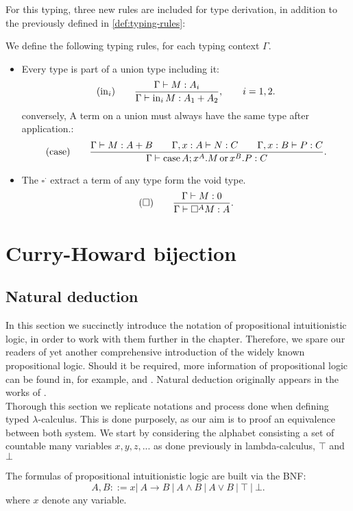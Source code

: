 For this typing, three new rules are included for type derivation, in addition to the previously defined in \ref{def:typing-rules}:
\begin{definition}
  We define the following typing rules, for each typing context $\Gamma$.
  \begin{itemize}
  \item Every type is part of a union type including it:
    $$  (\operatorname{in}_i)\qquad  {\displaystyle\Gamma \vdash M:A_i \over \Gamma \vdash \operatorname{in}_i M:A_1+A_2},\qquad  i=  1,2.$$
  conversely, A term on a union must always have the same type after application.:
    $$(\operatorname{case}) \qquad {\displaystyle \Gamma\vdash M: A+B\qquad \Gamma, x:A\vdash N: C\qquad \Gamma, x:B\vdash P: C \over \Gamma \vdash \operatorname{case}A ; x^{A}.M\operatorname{ or }x^{B}.P:C}.$$
  \item The $\square^\cdot$ extract a term of any type form the void type.
    $$  (\square)\qquad  {\displaystyle\Gamma \vdash M:0 \over \Gamma \vdash \square^A M:A}.$$
  \end{itemize}
\end{definition}
\section{Curry-Howard bijection}
\subsection{Natural deduction}
In this section we succinctly introduce the notation of propositional intuitionistic logic, in order to work with them further in the chapter. Therefore, we spare our readers of yet another comprehensive introduction of the widely known propositional logic. Should it be required, more information of propositional logic can be found in, for example, \cite{marek2009introduction} and \cite{wadler2015propositions}. Natural deduction originally appears in the works of \cite{gentzen1935untersuchungen}. \\

Thorough this section we replicate notations and process done when defining typed $\lambda$-calculus. This is done purposely, as our aim is to proof an equivalence between both system. We start by considering the alphabet consisting a set of countable many variables $x,y,z,...$ as done previously in lambda-calculus, $\top$ and $\bot$ 

\begin{definition}
  The formulas of propositional intuitionistic logic are built via the BNF:
  $$A,B ::= x |\ A\to B\ |\ A \land B \ |\ A \lor B \ |\ \top \ |\ \bot .$$
  where $x$ denote any variable.
\end{definition}


